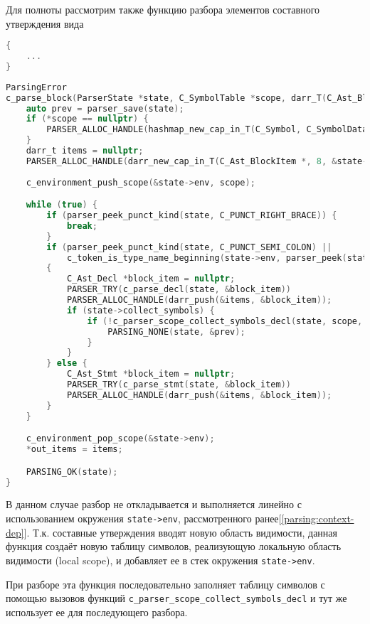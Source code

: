 Для полноты рассмотрим также функцию разбора элементов составного утверждения вида

\begin{lstlisting}[language=c]
{
    ...
}
\end{lstlisting}

\begin{lstlisting}[language=c, caption={Функция разбора элеметов составного утверждения}, label={parsing:c-parse-block}]
ParsingError
c_parse_block(ParserState *state, C_SymbolTable *scope, darr_T(C_Ast_BlockItem *) *out_items) {
    auto prev = parser_save(state);
    if (*scope == nullptr) {
        PARSER_ALLOC_HANDLE(hashmap_new_cap_in_T(C_Symbol, C_SymbolData, 8, &state->ast_alloc, scope));
    }
    darr_t items = nullptr;
    PARSER_ALLOC_HANDLE(darr_new_cap_in_T(C_Ast_BlockItem *, 8, &state->ast_alloc, &items));
    
    c_environment_push_scope(&state->env, scope);

    while (true) {
        if (parser_peek_punct_kind(state, C_PUNCT_RIGHT_BRACE)) {
            break;
        }
        if (parser_peek_punct_kind(state, C_PUNCT_SEMI_COLON) || 
            c_token_is_type_name_beginning(state->env, parser_peek(state))) 
        {
            C_Ast_Decl *block_item = nullptr;
            PARSER_TRY(c_parse_decl(state, &block_item))
            PARSER_ALLOC_HANDLE(darr_push(&items, &block_item));
            if (state->collect_symbols) {
                if (!c_parser_scope_collect_symbols_decl(state, scope, block_item)) {
                    PARSING_NONE(state, &prev);
                }
            }
        } else {
            C_Ast_Stmt *block_item = nullptr;
            PARSER_TRY(c_parse_stmt(state, &block_item))
            PARSER_ALLOC_HANDLE(darr_push(&items, &block_item));
        }
    }

    c_environment_pop_scope(&state->env);
    *out_items = items;

    PARSING_OK(state);
}
\end{lstlisting}
 

В данном случае разбор не откладывается и выполняется линейно с использованием окружения \verb|state->env|, рассмотренного ранее[\ref{parsing:context-dep}]. 
Т.к. составные утверждения вводят новую область видимости, данная функция создаёт новую таблицу символов, 
реализующую локальную область видимости (local scope), и добавляет ее в стек окружения \verb|state->env|. 

При разборе эта функция последовательно заполняет таблицу символов с помощью вызовов функций \verb|c_parser_scope_collect_symbols_decl| и тут же использует ее для последующего разбора.

